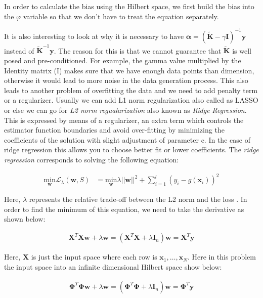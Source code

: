 \documentclass[conference]{IEEEtran}
\begin{document}
In order to calculate the bias using the Hilbert space, we first
build the bias into the $\varphi$ variable so that we don't have to treat the equation separately. 

It is also interesting to look at why it is necessary to have $\mathbf{\alpha} = (\mathbf{\widetilde{K}} - \gamma \mathbf{I})^{-1} \mathbf{y}$ 
instead of $\mathbf{\widetilde{K}}^{-1}\mathbf{y}$. The reason for this is that we cannot guarantee that $\mathbf{\widetilde{K}}$ is well posed and pre-conditioned.
For example, the gamma value multiplied by the Identity matrix (I) makes sure that we have enough data points than dimension, otherwise it would lead to more noise in the data generation process. This also leads to another problem of overfitting the data and we need to add penalty term or a regularizer. Usually we can add L1 norm regularization also called as LASSO or else we can go for \emph{L2 norm regualarization} also known as \emph{Ridge Regression}. This is expressed by means of a regularizer, an extra term which controls the estimator function boundaries and avoid over-fitting by minimizing the coefficients of the solution with slight adjustment of parameter c. In the case of ridge regression this allows you to choose better fit or lower coefficients.
The \emph{ridge regression} corresponds to solving the following equation: 

\begin{align*}
\underset{\mathbf{w}}{\text{min}} \mathbf{\mathcal{L}}_\lambda (\mathbf{w}, S) &= 
\underset{\mathbf{w}}{\text{min}} \lambda ||\mathbf{w}||^2 + \sum_{i=1}^{l}(y_i - g(\mathbf{x}_i))^2
\end{align*}

Here, $\lambda$ represents the relative trade-off between the L2 norm and the loss \cite{kernelmethods}. In order to find the minimum of this equation, 
we need to take the derivative as shown below: 

\begin{align*}
\mathbf{X}^T\mathbf{X}\mathbf{w} + \lambda\mathbf{w} = (\mathbf{X}^T\mathbf{X} + \lambda \mathbf{I}_n)\mathbf{w} = \mathbf{X}^T\mathbf{y}
\end{align*}

Here, $\mathbf{X}$ is just the input space where each row is $\mathbf{x}_1, \ldots, \mathbf{x}_N$. Here in this problem  the input space into an infinite dimensional Hilbert space show below: 

\begin{align*}
\mathbf{\Phi}^T\mathbf{\Phi}\mathbf{w} + \lambda\mathbf{w} = (\mathbf{\Phi}^T\mathbf{\Phi} + \lambda \mathbf{I}_n)\mathbf{w} = \mathbf{\Phi}^T\mathbf{y}
\end{align*}
\end{document}
